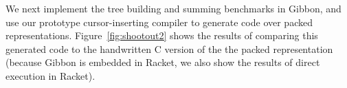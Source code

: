 \documentclass[a4paper,english]{lipics-v2016}
\newcommand{\treelang}{Gibbon\xspace} %
\begin{document}
We next implement the tree building and summing benchmarks in \treelang{}, and
use our prototype cursor-inserting compiler to generate code over packed
representations. Figure~\ref{fig:shootout2} shows the results of comparing this
generated code to the handwritten C version of the the packed representation
(because \treelang{} is embedded in Racket, we also show the results of direct
execution in Racket).
%





% 
% 
% 
\end{document}
